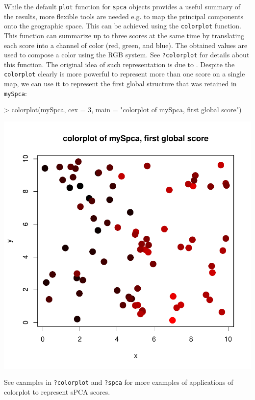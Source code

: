 \documentclass{article}
\begin{document}
While the default \texttt{plot} function for \texttt{spca} objects provides a useful summary of the
results, more flexible tools are needed e.g. to map the principal components onto the geographic space.
This can be achieved using the
\texttt{colorplot} function.
This function can summarize up to three scores at the same time by
translating each score into a channel of color (red, green, and blue).
The obtained values are used to compose a color using the RGB system.
See \texttt{?colorplot} for details about this function.
The original idea of such representation is due to \cite{tj179}.
Despite the \texttt{colorplot} clearly is more powerful to represent
more than one score on a single map, we can use it to represent the
first global structure that was retained in \texttt{mySpca}:
\begin{Schunk}
\begin{Sinput}
> colorplot(mySpca, cex = 3, main = "colorplot of mySpca, first global score")
\end{Sinput}
\end{Schunk}
\includegraphics{figs/spca-colorplot}

\noindent See examples in \texttt{?colorplot} and \texttt{?spca}
for more examples of applications of colorplot to represent sPCA scores.
\\
\end{document}
